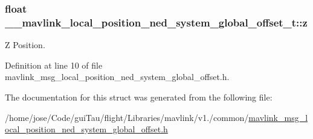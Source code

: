 \hypertarget{struct____mavlink__local__position__ned__system__global__offset__t_a39ca4444559388d75cb066b14db24a4b}{
\subsubsection[{z}]{\setlength{\rightskip}{0pt plus 5cm}float \-\_\-\-\_\-mavlink\-\_\-local\-\_\-position\-\_\-ned\-\_\-system\-\_\-global\-\_\-offset\-\_\-t\-::z}}\label{struct____mavlink__local__position__ned__system__global__offset__t_a39ca4444559388d75cb066b14db24a4b}


Z Position. 



Definition at line 10 of file mavlink\-\_\-msg\-\_\-local\-\_\-position\-\_\-ned\-\_\-system\-\_\-global\-\_\-offset.\-h.



The documentation for this struct was generated from the following file\-:\begin{DoxyCompactItemize}
\item 
/home/jose/\-Code/gui\-Tau/flight/\-Libraries/mavlink/v1./common/\hyperlink{mavlink__msg__local__position__ned__system__global__offset_8h}{mavlink\-\_\-msg\-\_\-local\-\_\-position\-\_\-ned\-\_\-system\-\_\-global\-\_\-offset.\-h}\end{DoxyCompactItemize}
